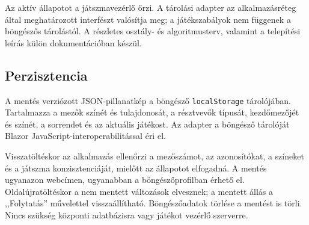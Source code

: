 \documentclass[11pt,a4paper]{article}
\begin{document}
Az aktív állapotot a játszmavezérlő őrzi. A tárolási adapter az
alkalmazásréteg által meghatározott interfészt valósítja meg;
a játékszabályok nem függenek a böngészős tárolástól.
A részletes osztály- és
algoritmusterv, valamint a telepítési leírás külön dokumentációban készül.

\subsection*{Perzisztencia}
A mentés verziózott JSON-pillanatkép a böngésző \texttt{localStorage}
tárolójában. Tartalmazza a mezők színét és tulajdonosát, a résztvevők
típusát, kezdőmezőjét és színét, a sorrendet és az aktuális játékost.
Az adapter a böngésző tárolóját Blazor JavaScript-interoperabilitással éri el.

Visszatöltéskor az alkalmazás ellenőrzi a mezőszámot, az azonosítókat,
a színeket és a játszma konzisztenciáját, mielőtt az állapotot elfogadná.
A mentés ugyanazon webcímen, ugyanabban a böngészőprofilban érhető el.
Oldalújratöltéskor a nem mentett változások elvesznek; a mentett állás
a ,,Folytatás'' művelettel visszaállítható. Böngészőadatok törlése a mentést
is törli. Nincs szükség központi adatbázisra vagy játékot vezérlő szerverre.
\end{document}
